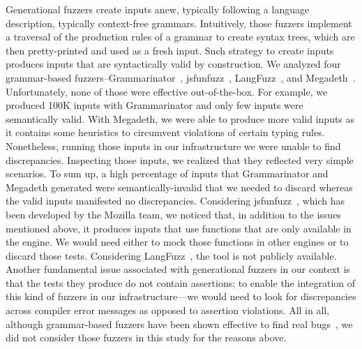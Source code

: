 \documentclass[smallextended]{svjour3}
\begin{document}
Generational fuzzers create inputs anew, typically following a
language description, typically context-free grammars. Intuitively,
those fuzzers implement a traversal of the production rules of a
grammar to create syntax trees, which are then pretty-printed and used
as a fresh input. Such strategy to create inputs produces inputs that
are syntactically valid by construction. We analyzed four
grammar-based fuzzers--Grammarinator~\cite{grammarinator},
jsfunfuzz~\cite{jsfunfuzz},
LangFuzz~\cite{Holler:2012:FCF:2362793.2362831}, and
Megadeth~\cite{grieco2016quickfuzz}.  Unfortunately, none of those
were effective out-of-the-box. For example, we produced 100K inputs
with Grammarinator and only few inputs were semantically valid. With
Megadeth, we were able to produce more valid
inputs as it contains some heuristics to circumvent violations of
certain typing rules.  Nonetheless, running those inputs in our
infrastructure we were unable to find discrepancies. Inspecting those
inputs, we realized that they reflected very simple scenarios. To sum
up, a high percentage of inputs that Grammarinator and Megadeth
generated were semantically-invalid that we needed to discard whereas
the valid inputs manifested no discrepancies. Considering
jsfunfuzz~\cite{jsfunfuzz}, which has been developed by the Mozilla
team, we noticed that, in addition to the issues mentioned above, it
produces inputs that use functions that are only available in the
\smonkey{} engine. We would need either to mock those functions in
other engines or to discard those tests. Considering
LangFuzz~\cite{Holler:2012:FCF:2362793.2362831}, the tool is not
publicly available. Another fundamental issue associated with
generational fuzzers in our context is that the tests they produce do
not contain assertions; to enable the integration of this kind of
fuzzers in our infrastructure---we would need to look for
discrepancies across compiler error messages as opposed to assertion
violations.  All in all, although grammar-based fuzzers have been
shown effective to find real
bugs~\cite{Holler:2012:FCF:2362793.2362831}, we did not consider those
fuzzers in this study for the reasons above.

\end{document}

